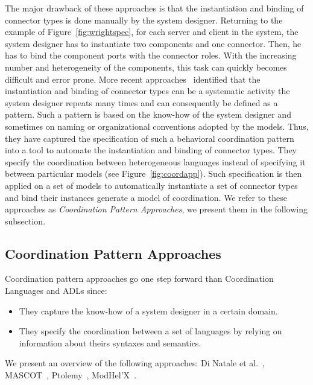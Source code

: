 The major drawback of these approaches is that the instantiation and binding of connector types is done manually by the system designer. Returning to the example of Figure~\ref{fig:wrightspec}, for each server and client in the system, the system designer has to instantiate two components and one connector. Then, he has to bind the component ports with the connector roles. With the increasing number and heterogeneity of the components, this task can quickly becomes difficult and error prone. More recent approaches~\cite{dinatale,mascotbib,ptoleframebib,modhelxbib} identified that the instantiation and binding of connector types can be a systematic activity the system designer repeats many times and can consequently be defined as a pattern. Such a pattern is based on the know-how of the system designer and sometimes on naming or organizational conventions adopted by the models. Thus, they have captured the specification of such a behavioral coordination pattern into a tool to automate the instantiation and binding of connector types. They specify the coordination between heterogeneous languages instead of specifying it between particular models (see Figure~\ref{fig:coordapp}). Such specification is then applied on a set of models to automatically instantiate a set of connector types and bind their instances \ie generate a model of coordination. We refer to these approaches as \emph{Coordination Pattern Approaches}, we present them in the following subsection.
         
\subsection{Coordination Pattern Approaches}

Coordination pattern approaches go one step forward than Coordination Languages and ADLs since:          
\begin{itemize}
   \item They capture the know-how of a system designer in a certain domain. 
   \item They specify the coordination between a set of languages by relying on information about theirs syntaxes and semantics. 
\end{itemize}
We present an overview of the following approaches: Di Natale et al.~\cite{dinatale}, MASCOT~\cite{mascotbib}, Ptolemy~\cite{ptoleframebib}, ModHel'X~\cite{modhelxbib}.
         	     	
